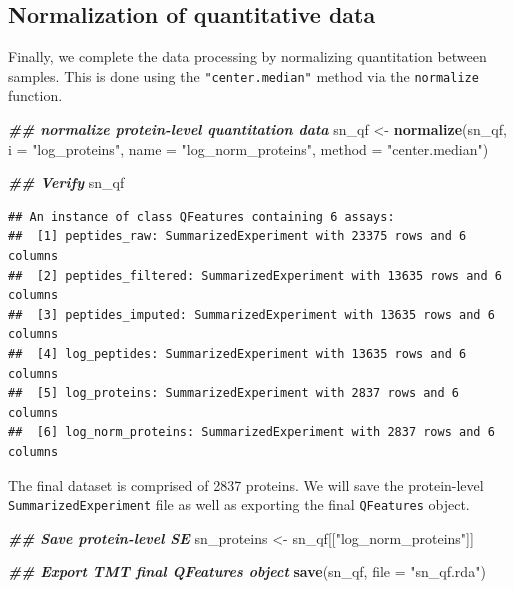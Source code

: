 \documentclass[9pt,a4paper,]{extarticle}
\newenvironment{Shaded}{\begin{snugshade}}{\end{snugshade}}
\newcommand{\AttributeTok}[1]{\textcolor[rgb]{0.13,0.29,0.53}{#1}}
\newcommand{\DocumentationTok}[1]{\textcolor[rgb]{0.56,0.35,0.01}{\textbf{\textit{#1}}}}
\newcommand{\FunctionTok}[1]{\textcolor[rgb]{0.13,0.29,0.53}{\textbf{#1}}}
\newcommand{\NormalTok}[1]{#1}
\newcommand{\OtherTok}[1]{\textcolor[rgb]{0.56,0.35,0.01}{#1}}
\newcommand{\StringTok}[1]{\textcolor[rgb]{0.31,0.60,0.02}{#1}}
\begin{document}
\hypertarget{normalization-of-quantitative-data-1}{%
\subsection{Normalization of quantitative data}\label{normalization-of-quantitative-data-1}}

Finally, we complete the data processing by normalizing quantitation between
samples. This is done using the \texttt{"center.median"} method via the \texttt{normalize}
function.

\begin{Shaded}
\begin{Highlighting}[]
\DocumentationTok{\#\# normalize protein{-}level quantitation data}
\NormalTok{sn\_qf }\OtherTok{\textless{}{-}} \FunctionTok{normalize}\NormalTok{(sn\_qf,}
                   \AttributeTok{i =} \StringTok{"log\_proteins"}\NormalTok{,}
                   \AttributeTok{name =} \StringTok{"log\_norm\_proteins"}\NormalTok{,}
                   \AttributeTok{method =} \StringTok{"center.median"}\NormalTok{)}

\DocumentationTok{\#\# Verify}
\NormalTok{sn\_qf}
\end{Highlighting}
\end{Shaded}

\begin{verbatim}
## An instance of class QFeatures containing 6 assays:
##  [1] peptides_raw: SummarizedExperiment with 23375 rows and 6 columns 
##  [2] peptides_filtered: SummarizedExperiment with 13635 rows and 6 columns 
##  [3] peptides_imputed: SummarizedExperiment with 13635 rows and 6 columns 
##  [4] log_peptides: SummarizedExperiment with 13635 rows and 6 columns 
##  [5] log_proteins: SummarizedExperiment with 2837 rows and 6 columns 
##  [6] log_norm_proteins: SummarizedExperiment with 2837 rows and 6 columns
\end{verbatim}

The final dataset is comprised of 2837 proteins.
We will save the protein-level \texttt{SummarizedExperiment} file as well as exporting
the final \texttt{QFeatures} object.

\begin{Shaded}
\begin{Highlighting}[]
\DocumentationTok{\#\# Save protein{-}level SE}
\NormalTok{sn\_proteins }\OtherTok{\textless{}{-}}\NormalTok{ sn\_qf[[}\StringTok{"log\_norm\_proteins"}\NormalTok{]]}

\DocumentationTok{\#\# Export TMT final QFeatures object}
\FunctionTok{save}\NormalTok{(sn\_qf, }\AttributeTok{file =} \StringTok{"sn\_qf.rda"}\NormalTok{)}
\end{Highlighting}
\end{Shaded}
\end{document}
